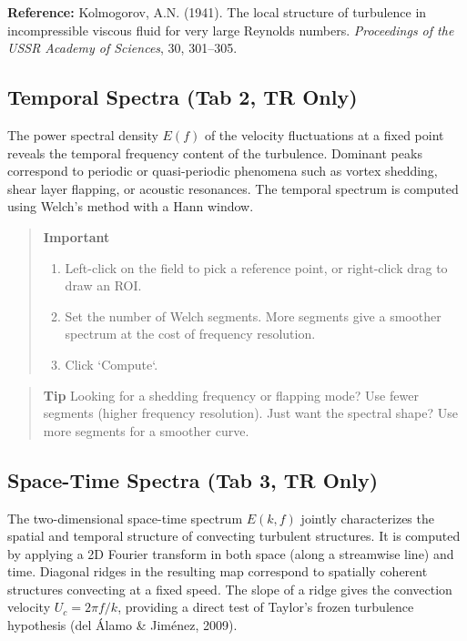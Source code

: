 \noindent\textbf{Reference:} Kolmogorov, A.N. (1941). The local structure of turbulence in incompressible viscous fluid for very large Reynolds numbers. \textit{Proceedings of the USSR Academy of Sciences}, 30, 301--305.

\subsection{Temporal Spectra (Tab 2, TR Only)}

The power spectral density $E(f)$ of the velocity fluctuations at a fixed point reveals the temporal frequency content of the turbulence. Dominant peaks correspond to periodic or quasi-periodic phenomena such as vortex shedding, shear layer flapping, or acoustic resonances. The temporal spectrum is computed using Welch's method with a Hann window.

\begin{quote}
\textbf{Important}
\begin{enumerate}[leftmargin=1.5em, topsep=2pt]
  \item Left-click on the field to pick a reference point, or right-click drag to draw an ROI.
  \item Set the number of Welch segments. More segments give a smoother spectrum at the cost of frequency resolution.
  \item Click `Compute`.
\end{enumerate}
\end{quote}

\begin{quote}
\textbf{Tip}
Looking for a shedding frequency or flapping mode? Use fewer segments (higher frequency resolution). Just want the spectral shape? Use more segments for a smoother curve.
\end{quote}

\subsection{Space-Time Spectra (Tab 3, TR Only)}

The two-dimensional space-time spectrum $E(k, f)$ jointly characterizes the spatial and temporal structure of convecting turbulent structures. It is computed by applying a 2D Fourier transform in both space (along a streamwise line) and time. Diagonal ridges in the resulting map correspond to spatially coherent structures convecting at a fixed speed. The slope of a ridge gives the convection velocity $U_c = 2\pi f / k$, providing a direct test of Taylor's frozen turbulence hypothesis (del Álamo \& Jiménez, 2009).

